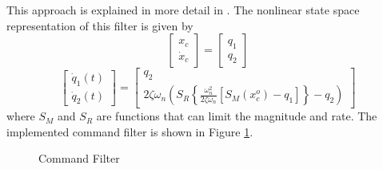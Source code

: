 This approach is explained in more detail in \cite{Borra2012}.
The nonlinear state space representation of this filter is given by
\begin{equation}\label{key}
\begin{bmatrix}
x_c\\
\dot{x}_c
\end{bmatrix}
=
\begin{bmatrix}
q_1\\
q_2
\end{bmatrix}
\end{equation}
\begin{equation}\label{key}
\begin{bmatrix}
\dot{q}_1(t)\\
\dot{q}_2(t)
\end{bmatrix}
=
\begin{bmatrix}
q_2\\
2\zeta\omega_n\left( S_R\left\lbrace \frac{\omega_n^2}{2\zeta\omega_n}\left[ S_M(x_c^o)-q_1\right] \right\rbrace-q_2 \right) 
\end{bmatrix}
\end{equation}
where $ S_M $ and $ S_R $ are functions that can limit the magnitude and rate. The implemented command filter is shown in Figure \ref{fig:set.cf}.
\begin{figure}[h!]
	\centering
	\caption{Command Filter\label{fig:set.cf}}
\end{figure}


